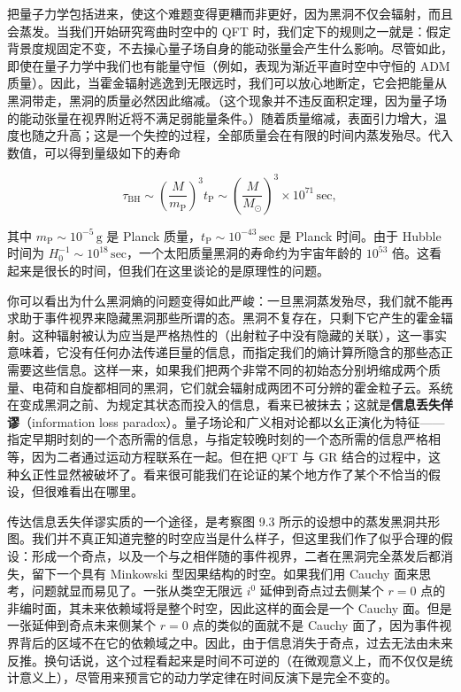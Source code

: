 把量子力学包括进来，使这个难题变得更糟而非更好，因为黑洞不仅会辐射，而且会蒸发。当我们开始研究弯曲时空中的 QFT 时，我们定下的规则之一就是：假定背景度规固定不变，不去操心量子场自身的能动张量会产生什么影响。尽管如此，即使在量子力学中我们也有能量守恒（例如，表现为渐近平直时空中守恒的 ADM 质量）。因此，当霍金辐射逃逸到无限远时，我们可以放心地断定，它会把能量从黑洞带走，黑洞的质量必然因此缩减。（这个现象并不违反面积定理，因为量子场的能动张量在视界附近将不满足弱能量条件。）随着质量缩减，表面引力增大，温度也随之升高；这是一个失控的过程，全部质量会在有限的时间内蒸发殆尽。代入数值，可以得到量级如下的寿命

\begin{equation*}
\tau_{\mathrm{BH}} \sim \left( \frac{M}{m_{\mathrm{P}}} \right)^{3} t_{\mathrm{P}} \sim \left( \frac{M}{M_{\odot}} \right)^{3} \times 10^{71}\,\mathrm{sec},
\tag{9.178}
\end{equation*}

其中 $m_{\mathrm{P}} \sim 10^{-5}\,\mathrm{g}$ 是 Planck 质量，$t_{\mathrm{P}} \sim 10^{-43}\,\mathrm{sec}$ 是 Planck 时间。由于 Hubble 时间为 $H_{0}^{-1} \sim 10^{18}\,\mathrm{sec}$，一个太阳质量黑洞的寿命约为宇宙年龄的 $10^{53}$ 倍。这看起来是很长的时间，但我们在这里谈论的是原理性的问题。

你可以看出为什么黑洞熵的问题变得如此严峻：一旦黑洞蒸发殆尽，我们就不能再求助于事件视界来隐藏黑洞那些所谓的态。黑洞不复存在，只剩下它产生的霍金辐射。这种辐射被认为应当是严格热性的（出射粒子中没有隐藏的关联），这一事实意味着，它没有任何办法传递巨量的信息，而指定我们的熵计算所隐含的那些态正需要这些信息。这样一来，如果我们把两个非常不同的初始态分别坍缩成两个质量、电荷和自旋都相同的黑洞，它们就会辐射成两团不可分辨的霍金粒子云。系统在变成黑洞之前、为规定其状态而投入的信息，看来已被抹去；这就是\textbf{信息丢失佯谬}（information loss paradox）。量子场论和广义相对论都以幺正演化为特征——指定早期时刻的一个态所需的信息，与指定较晚时刻的一个态所需的信息严格相等，因为二者通过运动方程联系在一起。但在把 QFT 与 GR 结合的过程中，这种幺正性显然被破坏了。看来很可能我们在论证的某个地方作了某个不恰当的假设，但很难看出在哪里。

传达信息丢失佯谬实质的一个途径，是考察图 9.3 所示的设想中的蒸发黑洞共形图。我们并不真正知道完整的时空应当是什么样子，但这里我们作了似乎合理的假设：形成一个奇点，以及一个与之相伴随的事件视界，二者在黑洞完全蒸发后都消失，留下一个具有 Minkowski 型因果结构的时空。如果我们用 Cauchy 面来思考，问题就显而易见了。一张从类空无限远 $i^{0}$ 延伸到奇点过去侧某个 $r = 0$ 点的非编时面，其未来依赖域将是整个时空，因此这样的面会是一个 Cauchy 面。但是一张延伸到奇点未来侧某个 $r = 0$ 点的类似的面就不是 Cauchy 面了，因为事件视界背后的区域不在它的依赖域之中。因此，由于信息消失于奇点，过去无法由未来反推。换句话说，这个过程看起来是时间不可逆的（在微观意义上，而不仅仅是统计意义上），尽管用来预言它的动力学定律在时间反演下是完全不变的。

